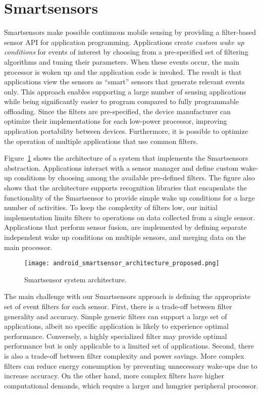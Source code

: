 \section{Smartsensors}
\label{sec:approach}

Smartsensors make possible continuous mobile sensing by providing a
filter-based sensor API for application programming.  Applications create
{\em custom wake up conditions} for events of interest by choosing
from a pre-specified set of filtering algorithms and tuning their
parameters.  When these events occur, the main processor is woken up
and the application code is invoked. The result is that applications
view the sensors as ``smart'' sensors that generate relevant events
only.  This approach enables supporting a large number of sensing
applications while being significantly easier to program compared to
fully programmable offloading. Since the filters are pre-specified,
the device manufacturer can optimize their implementations for each
low-power processor, improving application portability between
devices.  Furthermore, it is possible to optimize the operation of
multiple applications that use common filters.

Figure~\ref{fig:smartarchitecture} shows the architecture of a
system that implements the Smartsensors abstraction.  Applications
interact with a sensor manager and define custom wake-up conditions by
choosing among the available pre-defined filters.  The figure also
shows that the architecture supports recognition libraries that
encapsulate the functionality of the Smartsensor to provide simple
wake up conditions for a large number of activities.  To keep the
complexity of filters low, our initial implementation limits filters
to operations on data collected from a single sensor.  Applications
that perform sensor fusion, are implemented by defining separate
independent wake up conditions on multiple sensors, and merging data on
the main processor.


\begin{figure}[t]
	\texttt{[image: android\_smartsensor\_architecture\_proposed.png]}
	\caption{Smartsensor system architecture.}
    \label{fig:smartarchitecture}
\end{figure}

The main challenge with our Smartsensors approach is defining the
appropriate set of event filters for each sensor.  First, there is a
trade-off between filter generality and accuracy.  Simple generic
filters can support a large set of applications, albeit no specific
application is likely to experience optimal performance.  Conversely, a
highly specialized filter may provide optimal performance but is only
applicable to a limited set of applications.  Second, there is also a
trade-off between filter complexity and power savings.  More complex
filters can reduce energy consumption by preventing unnecessary
wake-ups due to increase accuracy.  On the other hand, more complex
filters have higher computational demands, which require a larger and
hungrier peripheral processor.

